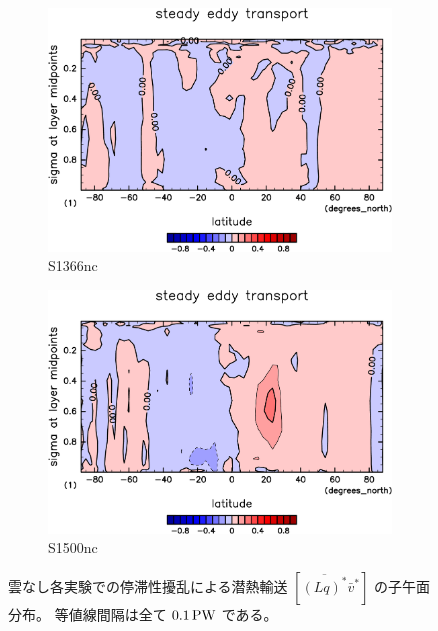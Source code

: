 \documentclass[body]{subfiles}
\begin{document}
\begin{figure}[t]
	\centering
	\begin{subfigure}{.4\textwidth}
		\centering
		\includegraphics[width=\textwidth]{S1366-nc/MeriHeatTransTest@latentEn_SE,time=3650:4015-crop-rotate.pdf}
		\caption{S1366nc}\label{潜熱停滞性擾乱S1366nc}
	\end{subfigure}
	\begin{subfigure}{.4\textwidth}
		\centering
		\includegraphics[width=\textwidth]{S1500-nc/MeriHeatTransTest@latentEn_SE,time=3650:4015-crop-rotate.pdf}
		\caption{S1500nc}\label{潜熱停滞性擾乱S1500nc}
	\end{subfigure}
	\caption[雲なし各実験でのに停滞性擾乱による潜熱輸送の子午面分布]{
		雲なし各実験での停滞性擾乱による潜熱輸送 \([\overline{(Lq)^*}\bar v^*]\) の子午面分布。
		等値線間隔は全て \(0.1\hmu{PW}\) である。
	}\label{潜熱停滞性擾乱nc}
\end{figure}
\end{document}
